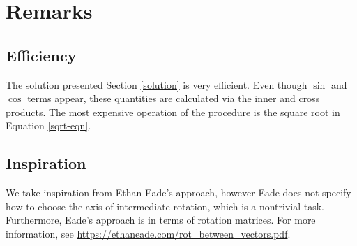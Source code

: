 \documentclass{article}
\begin{document}
\section{Remarks}

\subsection{Efficiency}
The solution presented Section \ref{solution} is very efficient.
Even though $\sin$ and $\cos$ terms appear, these quantities are calculated via
the inner and cross products.
The most expensive operation of the procedure is the square root in Equation \ref{sqrt-eqn}.

\subsection{Inspiration}

We take inspiration from Ethan Eade's approach, however Eade does not specify how to choose the axis of intermediate rotation, which
is a nontrivial task.
Furthermore, Eade's approach is in terms of rotation matrices. For more information, see \url{https://ethaneade.com/rot_between_vectors.pdf}.
\end{document}
